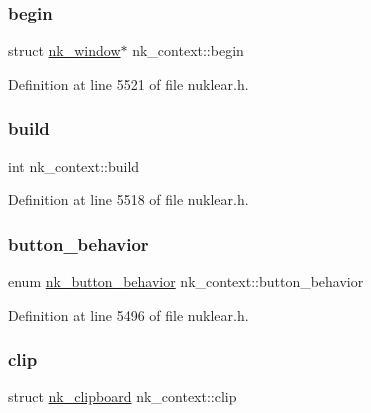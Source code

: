 \mbox{\label{structnk__context_a43a1c4cf1a69b90ad33b78789915d4eb}} 
\subsubsection{\texorpdfstring{begin}{begin}}
{\footnotesize\ttfamily struct \mbox{\hyperlink{structnk__window}{nk\+\_\+window}}$\ast$ nk\+\_\+context\+::begin}



Definition at line 5521 of file nuklear.\+h.

\mbox{\label{structnk__context_a0d0f953ef2b6c56b046e4e5488d074e6}} 
\subsubsection{\texorpdfstring{build}{build}}
{\footnotesize\ttfamily int nk\+\_\+context\+::build}



Definition at line 5518 of file nuklear.\+h.

\mbox{\label{structnk__context_a1b37f5fdd034ad23c79f90a0094ac349}} 
\subsubsection{\texorpdfstring{button\+\_\+behavior}{button\_behavior}}
{\footnotesize\ttfamily enum \mbox{\hyperlink{nuklear_8h_aa9c50dd424dfcd57bab32dea3505ea26}{nk\+\_\+button\+\_\+behavior}} nk\+\_\+context\+::button\+\_\+behavior}



Definition at line 5496 of file nuklear.\+h.

\mbox{\label{structnk__context_a834f5a5fad2919a354472381b013a81f}} 
\subsubsection{\texorpdfstring{clip}{clip}}
{\footnotesize\ttfamily struct \mbox{\hyperlink{structnk__clipboard}{nk\+\_\+clipboard}} nk\+\_\+context\+::clip}



